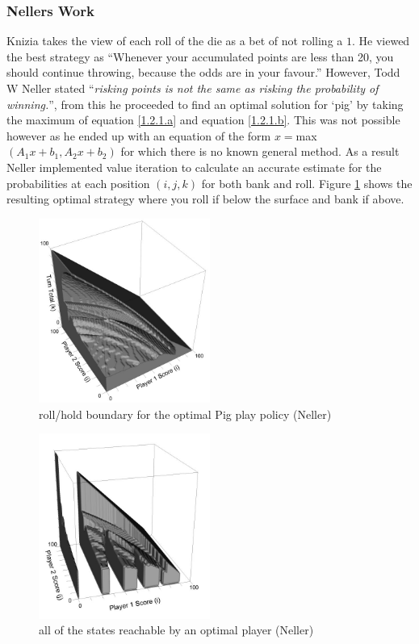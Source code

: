 \documentclass[a4paper,titlepage]{article}
\begin{document}
\subsubsection{Nellers Work}
Knizia takes the view of each roll of the die as a bet of not rolling a $1$. He viewed the best strategy as ``Whenever your accumulated points are less than 20, you should continue throwing, because the odds are in your favour.''\cite{knizia2010dice} However, Todd W Neller stated ``\textit{risking points is not the same as risking the probability of winning.}''\cite{neller2004optimal}, from this he proceeded to find an optimal solution for `pig' by taking the maximum of equation \ref{1.2.1.a} and equation \ref{1.2.1.b}. This was not possible however as he ended up with an equation of the form $x=$max$ (A_1 x+b_1,A_2 x+b_2)$ for which there is no known general method. As a result Neller implemented value iteration to calculate an accurate estimate for the probabilities at each position $(i,j,k)$ for both bank and roll. Figure \ref{figure1} shows the resulting optimal strategy where you roll if below the surface and bank if above.

\begin{figure}
\centering
\includegraphics[width=0.5\textwidth]{neller_optimal_solution}
\caption{roll\slash hold boundary for the optimal Pig play policy (Neller)\label{figure1}}
\end{figure}
\begin{figure}
\centering
\includegraphics[width=0.5\textwidth]{neller_optimal_solution_2}
\caption{all of the states reachable by an optimal player (Neller)\label{figure2}}
\end{figure}
\end{document}
